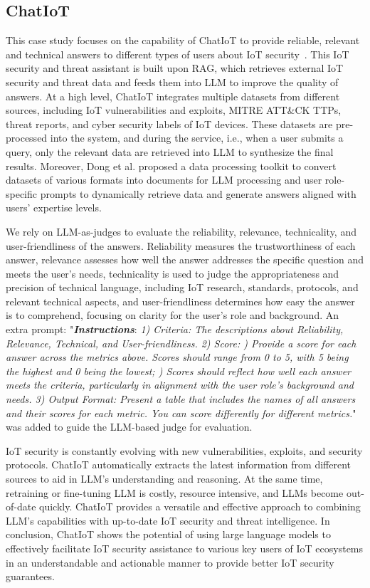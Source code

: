 \subsection{ChatIoT}
This case study focuses on the capability of ChatIoT to provide reliable, relevant and technical answers to different types of users about IoT security~\citet{dong2024chatiot}.
This IoT security and threat assistant is built upon RAG, which retrieves external IoT security and threat data and feeds them into LLM to improve the quality of answers.
At a high level, ChatIoT integrates multiple datasets from different sources, including IoT vulnerabilities and exploits, MITRE ATT\&CK TTPs, threat reports, and cyber security labels of IoT devices.
These datasets are pre-processed into the system, and during the service, i.e., when a user submits a query, only the relevant data are retrieved into LLM to synthesize the final results. 
Moreover, Dong et al. proposed a data processing toolkit to convert datasets of various formats into documents for LLM processing and user role-specific prompts to dynamically retrieve data and generate answers aligned with users' expertise levels.

We rely on LLM-as-judges to evaluate the reliability, relevance, technicality, and user-friendliness of the answers.
Reliability measures the trustworthiness of each answer, relevance assesses how well the answer addresses the specific question and meets the user’s needs, technicality is used to judge the appropriateness and precision of technical language, including IoT research, standards, protocols, and relevant technical aspects, and user-friendliness determines how easy the answer is to comprehend, focusing on clarity for the user’s role and background.
An extra prompt: "\textbf{\textit{Instructions}}: \textit{1) Criteria: The descriptions about Reliability, Relevance, Technical, and User-friendliness.
2) Score: ) Provide a score for each answer across the metrics above. Scores should range from 0 to 5, with 5 being the highest and 0 being the lowest; ) Scores should reflect how well each answer meets the criteria, particularly in alignment with the user role's background and needs.
3) Output Format: Present a table that includes the names of all answers and their scores for each metric. You can score differently for different metrics.}"
was added to guide the LLM-based judge for evaluation.

IoT security is constantly evolving with new vulnerabilities, exploits, and security protocols.
ChatIoT automatically extracts the latest information from different sources to aid in LLM's understanding and reasoning.
At the same time, retraining or fine-tuning LLM is costly, resource intensive, and LLMs become out-of-date quickly.
ChatIoT provides a versatile and effective approach to combining LLM's capabilities with up-to-date IoT security and threat intelligence. 
In conclusion, ChatIoT shows the potential of using large language models to effectively facilitate IoT security assistance to various key users of IoT ecosystems in an understandable and actionable manner to provide better IoT security guarantees.